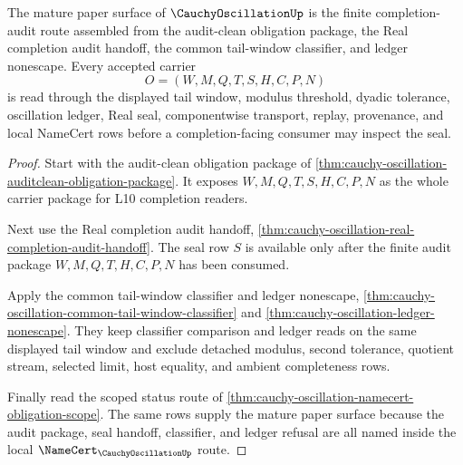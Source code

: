 \begin{theorem}
\label{thm:cauchy-oscillation-mature-status-route}
The mature paper surface of $\CauchyOscillationUp$ is the finite completion-audit route assembled from the audit-clean obligation package, the Real completion audit handoff, the common tail-window classifier, and ledger nonescape. Every accepted carrier
$$
O=(W,M,Q,T,S,H,C,P,N)
$$
is read through the displayed tail window, modulus threshold, dyadic tolerance, oscillation ledger, Real seal, componentwise transport, replay, provenance, and local NameCert rows before a completion-facing consumer may inspect the seal.
\end{theorem}
\begin{proof}
Start with the audit-clean obligation package of \autoref{thm:cauchy-oscillation-auditclean-obligation-package}. It exposes $W,M,Q,T,S,H,C,P,N$ as the whole carrier package for L10 completion readers.

Next use the Real completion audit handoff, \autoref{thm:cauchy-oscillation-real-completion-audit-handoff}. The seal row $S$ is available only after the finite audit package $W,M,Q,T,H,C,P,N$ has been consumed.

Apply the common tail-window classifier and ledger nonescape, \autoref{thm:cauchy-oscillation-common-tail-window-classifier} and \autoref{thm:cauchy-oscillation-ledger-nonescape}. They keep classifier comparison and ledger reads on the same displayed tail window and exclude detached modulus, second tolerance, quotient stream, selected limit, host equality, and ambient completeness rows.

Finally read the scoped status route of \autoref{thm:cauchy-oscillation-namecert-obligation-scope}. The same rows supply the mature paper surface because the audit package, seal handoff, classifier, and ledger refusal are all named inside the local $\NameCert_{\CauchyOscillationUp}$ route.
\end{proof}

